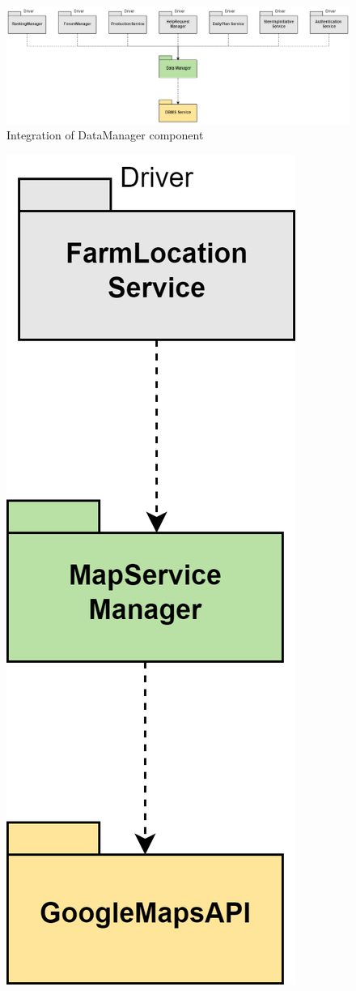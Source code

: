 \documentclass[table, 12pt]{article}
\begin{document}
\begin{figure}[H]
    \includegraphics[scale=0.5, center]{assets/Test/generalTest.png}
    \caption{Integration of DataManager component}
    \label{fig: integration_DataManager}
\end{figure}

\begin{figure}[H]
    \centering
    \includegraphics[scale=0.56]{assets/Test/farmLocationTest.png} 

\end{figure}
\end{document}
